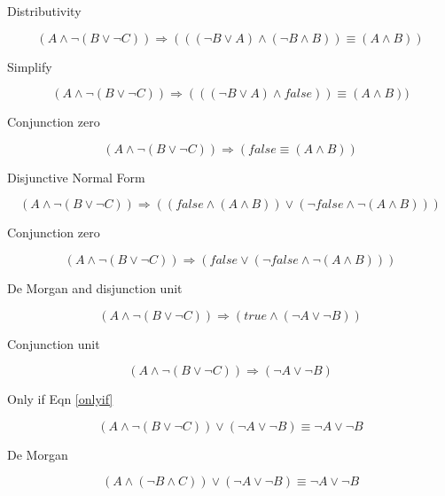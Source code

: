 \documentclass[10pt,a4paper]{article}
\begin{document}
Distributivity 

\begin{equation}
 (A \wedge \neg(B\vee \neg C)) \Rightarrow (((\neg B \vee A)\wedge(\neg B \wedge B)) \equiv (A\wedge B))
\end{equation}

Simplify 

\begin{equation}
 (A \wedge \neg(B\vee \neg C)) \Rightarrow (((\neg B \vee A)\wedge false)) \equiv (A\wedge B))
\end{equation}

Conjunction zero

\begin{equation}
 (A \wedge \neg(B\vee \neg C)) \Rightarrow ( false \equiv (A\wedge B))
\end{equation}

Disjunctive Normal Form

\begin{equation}
 (A \wedge \neg(B\vee \neg C)) \Rightarrow (( false \wedge (A\wedge B))\vee (\neg false \wedge \neg(A\wedge B)))
\end{equation}

Conjunction zero

\begin{equation}
 (A \wedge \neg(B\vee \neg C)) \Rightarrow (false \vee (\neg false \wedge \neg(A\wedge B)))
\end{equation}

De Morgan and disjunction unit

\begin{equation}
 (A \wedge \neg(B\vee \neg C)) \Rightarrow (true \wedge (\neg A\vee \neg B))
\end{equation}

Conjunction unit

\begin{equation}
 (A \wedge \neg(B\vee \neg C)) \Rightarrow  (\neg A\vee \neg B)
\end{equation}

Only if Eqn \ref{onlyif}

\begin{equation}
(A \wedge \neg(B \vee \neg C)) \vee (\neg A \vee \neg B) \equiv \neg A \vee \neg B 
\end{equation}

De Morgan

\begin{equation}
 (A \wedge(\neg B \wedge C)) \vee (\neg A \vee \neg B) \equiv \neg A \vee \neg B 
\end{equation}
\end{document}
